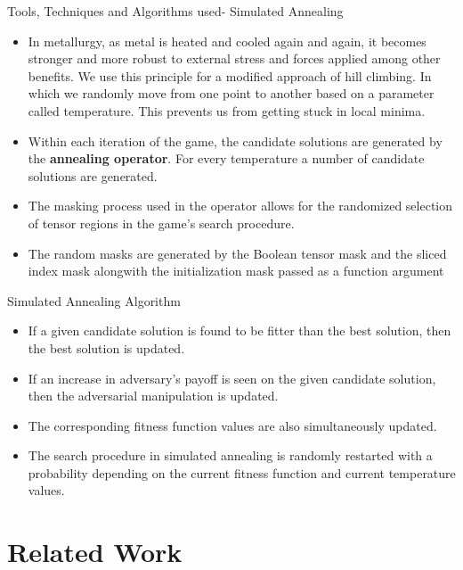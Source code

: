 \documentclass[10pt]{beamer}
\begin{document}
\begin{frame}{Tools, Techniques and Algorithms used- Simulated Annealing}
	\begin{itemize}
	    \item In metallurgy, as metal is heated and cooled again and again, it becomes stronger and more robust to external stress and forces applied among other benefits. We use this principle for a modified approach of hill climbing. In which we randomly move from one point to another based on a parameter called temperature. This prevents us from getting stuck in local minima.
        \item Within each iteration of the game, the candidate solutions are generated by the {\bf annealing operator}. For every temperature a number of candidate solutions are generated. 
        \item The masking process used in the operator allows for the randomized selection of tensor regions in the game’s search procedure. 
        \item The random masks are generated by the Boolean tensor mask and the sliced index mask alongwith the initialization mask passed as a function argument 
	\end{itemize}
\end{frame}


\begin{frame}{Simulated Annealing Algorithm}
	\begin{itemize}
        \item If a given candidate solution is found to be fitter than the best solution, then the best solution is updated.
        \item If an increase in adversary’s payoff is seen on the given candidate solution, then the adversarial manipulation is updated. 
        \item The corresponding fitness function values are also simultaneously updated. 
        \item The search procedure in simulated annealing is randomly restarted with a probability depending on the current fitness function and current temperature values. 
	\end{itemize}
\end{frame}


\section{Related Work}
\end{document}
